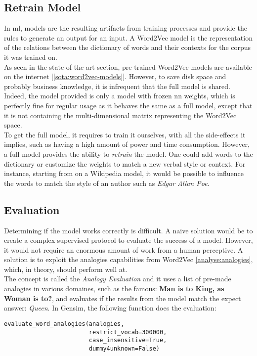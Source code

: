 \subsection{Retrain Model}
\label{analyse:retrain}
In \gls{ml}, models are the resulting artifacts from training processes and provide the rules to generate an output for an input. A Word2Vec model is the representation of the relations between the dictionary of words and their contexts for the corpus it was trained on.\\

As seen in the state of the art section, pre-trained Word2Vec models are available on the internet [\ref{sota:word2vec-models}]. However, to save disk space and probably business knowledge, it is infrequent that the full model is shared. Indeed, the model provided is only a model with frozen \gls{nn} weights, which is perfectly fine for regular usage as it behaves the same as a full model, except that it is not containing the multi-dimensional matrix representing the Word2Vec space.\\

To get the full model, it requires to train it ourselves, with all the side-effects it implies, such as having a high amount of power and time consumption. However, a full model provides the ability to \textit{retrain} the model. One could add words to the dictionary or customize the weights to match a new verbal style or context. For instance, starting from on a Wikipedia model, it would be possible to influence the words to match the style of an author such as \textit{Edgar Allan Poe}.


\subsection{Evaluation}
\label{analyse:evaluation}
Determining if the model works correctly is difficult. A naive solution would be to create a complex supervised protocol to evaluate the success of a model. However, it would not require an enormous amount of work from a human perceptive. A solution is to exploit the analogies capabilities from Word2Vec \ref{analyse:analogies}, which, in theory, should perform well at.\\

The concept is called the \textit{Analogy Evaluation} and it uses a list of pre-made analogies in various domaines, such as the famous: \textbf{Man is to King, as Woman is to?}, and evaluates if the results from the model match the expect answer: \textit{Queen}. In Gensim, the following function does the evaluation: 
\begin{lstlisting}
evaluate_word_analogies(analogies,
                        restrict_vocab=300000,
                        case_insensitive=True,
                        dummy4unknown=False)
\end{lstlisting}
\vspace{1em}


